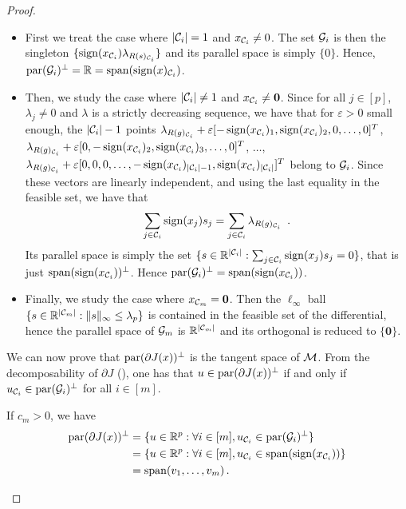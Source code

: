 \begin{proof}
\begin{enumerate}
\begin{itemize}
			      \item First we treat the case where $|\mathcal{C}_i|=1$  and $x_{\mathcal{C}_i}\neq 0$.
			            The set $\mathcal{G}_i$ is then the singleton $\{\operatorname{sign}(x_{\mathcal{C}_i})\lambda_{R(s)_{\mathcal{C}_i}}\}$ and its parallel space is simply $\{0\}$.
			            Hence, $\operatorname{par}(\mathcal{G}_i)^\perp = \mathbb{R} = \operatorname{span} (\operatorname{sign}(x)_{\mathcal{C}_i})$.
			      \item Then, we study the case where $|\mathcal{C}_i|\neq 1$  and $x_{\mathcal{C}_i}\neq \textbf{0}$.
			            Since for all $j \in [p]$, $\lambda_j\neq 0$ and $\lambda$ is a strictly decreasing sequence, we have that for $\varepsilon > 0$ small enough, the $|\mathcal{C}_i| -1$ points $\lambda_{R(g)_{\mathcal{C}_i}} + \varepsilon [-\operatorname{sign}(x_{\mathcal{C}_i})_1, \operatorname{sign}(x_{\mathcal{C}_i})_2, 0, \hdots, 0]^T$, $\lambda_{R(g)_{\mathcal{C}_i}} + \varepsilon [0, -\operatorname{sign}(x_{\mathcal{C}_i})_2, \operatorname{sign}(x_{\mathcal{C}_i})_3, \hdots, 0]^T$, $\hdots$, $\lambda_{R(g)_{\mathcal{C}_i}} + \varepsilon [0, 0, 0, \hdots,-\operatorname{sign}(x_{\mathcal{C}_i})_{|\mathcal{C}_{i}|-1}, \operatorname{sign}(x_{\mathcal{C}_i})_{|\mathcal{C}_{i}|}]^T$ belong to $\mathcal{G}_i$.
			            Since these vectors are linearly independent, and using the last equality in the feasible set, we have that
			            \begin{align}
				            \sum_{j\in \mathcal{C}_i} \operatorname{sign}(x_j)s_j = \sum_{j \in \mathcal{C}_i}  \lambda_{R(g)_{\mathcal{C}_i}} \nonumber \enspace .
			            \end{align}
			            Its parallel space is simply the set $\{s\in\mathbb{R}^{|\mathcal{C}_i|} : \sum_{j\in \mathcal{C}_i} \operatorname{sign}(x_j)s_j = 0\}$, that is just $\operatorname{span}(\operatorname{sign}(x_{\mathcal{C}_i}))^\perp$.
			            Hence $\operatorname{par}(\mathcal{G}_i)^\perp = \operatorname{span}(\operatorname{sign}(x_{\mathcal{C}_i}))$.

			      \item  Finally, we study the case where $x_{\mathcal{C}_m} = \textbf{0}$.
			            Then the $\ell_\infty$ ball $\{s \in \mathbb{R}^{|\mathcal{C}_m|}: \Vert s \Vert_\infty \leq \lambda_p\}$ is contained in the feasible set of the differential, hence the parallel space of $\mathcal{G}_m$ is $\mathbb{R}^{|\mathcal{C}_m|}$ and its orthogonal is reduced to $\{ \mathbf{0} \}$.
		      \end{itemize}

		      We can now prove that $\operatorname{par}(\partial J(x))^\perp$ is the tangent space of $\mathcal{M}$.
		      From the decomposability of $\partial J$ (), one has that $u \in \operatorname{par}(\partial J(x)) ^\perp$ if and only if $u_{\mathcal{C}_i} \in \operatorname{par} (\mathcal{G}_i)^\perp$ for all $i \in [m]$.

		      If $c_m > 0$, we have
		      \begin{equation}
			      \begin{aligned}
				      \operatorname{par}(\partial J(x))^\perp & = \{ u \in \mathbb{R}^p : \forall i \in [m], u_{\mathcal{C}_i} \in \operatorname{par} (\mathcal{G}_i)^\perp \}   \\
				                                   & = \{ u \in \mathbb{R}^p : \forall i \in [m], u_{\mathcal{C}_i} \in \operatorname{span}(\operatorname{sign}(x_{\mathcal{C}_i})) \} \\
				                                   & = \operatorname{span}(v_1, \ldots, v_m) \, .
			      \end{aligned}
		      \end{equation}


\end{enumerate}
\end{proof}
